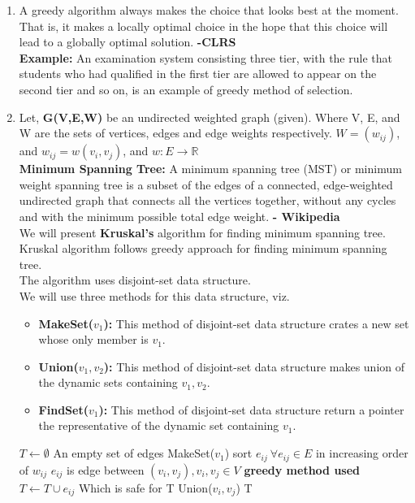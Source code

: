 \documentclass[12pt,a4paper,final]{article}
\theoremstyle{definition}
\begin{document}
\begin{enumerate}
\begin{enumerate}
\item
A greedy algorithm always makes the choice that looks best at the moment. That is, it makes a locally optimal choice in the hope that this choice will lead to a globally optimal solution. \textbf{-CLRS}\\
\textbf{Example: } An examination system consisting three tier, with the rule that students who had qualified in the first tier are allowed to appear on the second tier and so on, is an example of greedy method of selection.

\item
Let, \textbf{G(V,E,W)} be an undirected weighted graph (given). Where V, E, and W are the sets of vertices, edges and edge weights respectively. $W=(w_{ij})$, and $w_{ij}=w(v_i,v_j)$, and $w: E \to \mathbb{R}$\\
\textbf{Minimum Spanning Tree: }A minimum spanning tree (MST) or minimum weight spanning tree is a subset of the edges of a connected, edge-weighted undirected graph that connects all the vertices together, without any cycles and with the minimum possible total edge weight. \textbf{- Wikipedia}\\
We will present \textbf{Kruskal's} algorithm for finding minimum spanning tree. Kruskal algorithm follows greedy approach for finding minimum spanning tree.\\
The algorithm uses disjoint-set data structure.\\
We will use three methods for this data structure, viz. 
\begin{itemize}
\item
\textbf{MakeSet($v_1$): }This method of disjoint-set data structure crates a new set whose only member is $v_1$.
\item
\textbf{Union($v_1,v_2$): }This method of disjoint-set data structure makes union of the dynamic sets containing $v_1, v_2$.
\item
\textbf{FindSet($v_1$): }This method of disjoint-set data structure return a pointer the representative of the dynamic set containing $v_1$.
\end{itemize}


\begin{algorithm}[H]
\caption{$Kruskal(V,E,W)$}
\begin{algorithmic}[1]
\State $T \gets \emptyset$ \Comment An empty set of edges
	\State MakeSet($v_1$)
\EndFor
\State sort $e_{ij} \:\forall e_{ij} \in E$ in increasing order of $w_{ij}$ \Comment $e_{ij}$ is edge between $(v_i,v_j), v_i,v_j \in V$
 \Comment \textbf{greedy method used}
		\State $T \gets T \cup e_{ij}$ \Comment Which is safe for T
		\State Union($v_i,v_j$)
	\EndIf
\EndFor
\State
\Return T
\end{algorithmic}
\end{algorithm}




\end{enumerate}
\end{enumerate}
\end{document}
